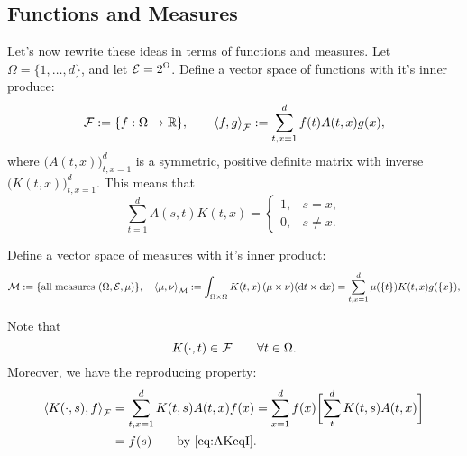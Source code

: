 \documentclass[reqno]{amsart}
\begin{document}
\subsection{Functions and Measures}
Let's now rewrite these ideas in terms of functions and measures.  Let $\Omega = \{1, \ldots, d\}$, and let $\ce = 2^\Omega$.  Define a vector space of functions with it's inner produce:
\begin{equation*}
    \cf : = \{f : \Omega \to \reals\}, \qquad \ip[\cf]{f}{g} := \sum_{t,x=1}^d f(t) A(t,x) g(x),
\end{equation*}
where $\bigl( A(t,x) \bigr)_{t,x = 1}^d$ is a symmetric, positive definite matrix with inverse $\bigl( K(t,x) \bigr)_{t,x = 1}^d$.  This means that
\begin{equation} \label{eq:AKeqI}
    \sum_{t=1}^d A(s,t)K(t,x) = \begin{cases} 1, & s=x, \\ 0, & s\ne x. \end{cases}
\end{equation}

Define a vector space of measures with it's inner product:
\begin{equation*}
    \cm : = \{\text{all measures } (\Omega, \ce, \mu) \}, \quad 
    \ip[\cm]{\mu}{\nu} := \int_{\Omega \times \Omega} K(t,x) \, (\mu \times \nu) (\dif t \times \dif x) = \sum_{t,x=1}^d \mu(\{t\}) K(t,x) g(\{x\}),
\end{equation*}

Note that 
\[
K(\cdot,t) \in \cf \qquad \forall t \in \Omega.
\]
Moreover, we have the reproducing property:
\begin{align*}
\ip[\cf]{K(\cdot,s)}{f} &=  \sum_{t,x=1}^d K(t,s) A(t,x) f(x) 
= \sum_{x=1}^d f(x) \biggl[\sum_{t}^d K(t,s) A(t,x) \biggr] \\
& = f(s) \qquad \text{by \eqref{eq:AKeqI}}.
\end{align*}
\end{document}
